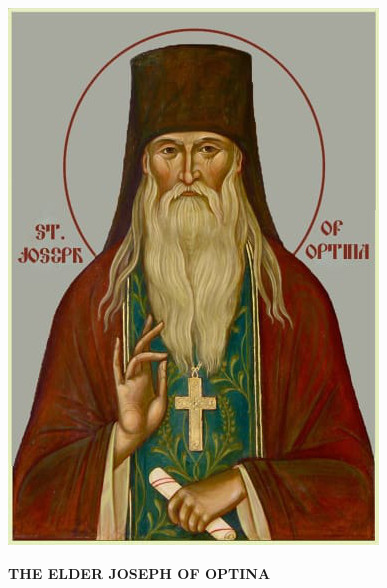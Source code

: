 \begin{center}
	\pagecolor{deepred}
	\includegraphics[width=\textwidth]{Images/StJosephOfOptina.jpg}
    
    \vspace*{\fill}

	\color{white}\LARGE \textbf{THE ELDER JOSEPH OF OPTINA}
\end{center}
\clearpage
\pagecolor{white}

